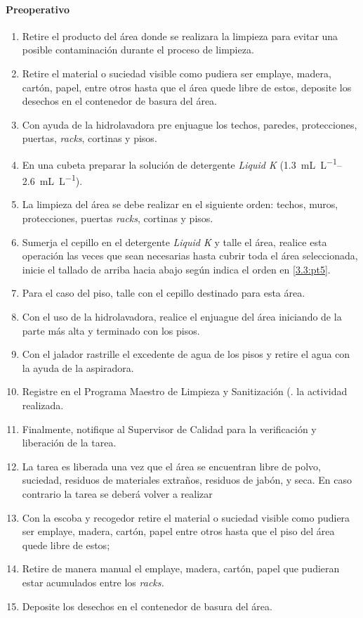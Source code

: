 \paragraph{Preoperativo}
\begin{enumerate}
	\item Retire el producto del área donde se realizara la limpieza para evitar una posible contaminación durante el proceso de limpieza.
	\item Retire el material o suciedad visible como pudiera ser emplaye, madera, cartón, papel, entre otros hasta que el área quede libre de estos, deposite los desechos en el contenedor de basura del área.
	\item Con ayuda de la hidrolavadora pre enjuague los techos, paredes, protecciones, puertas, \textit{racks}, cortinas y pisos.
	\item En una cubeta preparar la solución de detergente \textit{Liquid K} (\qtyrange{1.3}{2.6}{\milli\liter\per\liter}).
	\item La limpieza del área se debe realizar en el siguiente orden: techos, muros, protecciones, puertas \textit{racks}, cortinas y pisos.\label{3.3:pt5}
	\item Sumerja el cepillo en el detergente \textit{Liquid K} y talle el área, realice esta operación las veces que sean necesarias hasta cubrir toda el área seleccionada, inicie el tallado de arriba hacia abajo según indica el orden en \cref{3.3:pt5}.
	\item Para el caso del piso, talle con el cepillo destinado para esta área.
	\item Con el uso de la hidrolavadora, realice el enjuague del área iniciando de la parte más alta y terminado con los pisos.
	\item Con el jalador rastrille el excedente de agua de los pisos y retire el agua con la ayuda de la aspiradora.
	\item Registre en el Programa Maestro de Limpieza y Sanitización (\RAC. la actividad realizada.
	\item Finalmente, notifique al Supervisor de Calidad para la verificación y liberación de la tarea.
	\item La tarea es liberada una vez que el área se encuentran libre de polvo, suciedad, residuos de materiales extraños, residuos de jabón, y seca. En caso contrario la tarea se deberá volver a realizar
	\item Con la escoba y recogedor retire el material o suciedad visible como pudiera ser emplaye, madera, cartón, papel entre otros hasta que el piso del área quede libre de estos;
	\item Retire de manera manual el emplaye, madera, cartón, papel que pudieran estar acumulados entre los \textit{racks.}
	\item Deposite los desechos en el contenedor de basura del área.
\end{enumerate}

